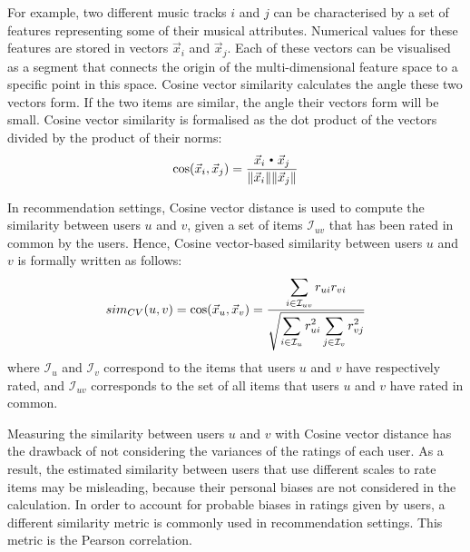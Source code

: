 For example, two different music tracks $i$ and $j$ can be characterised by a set of features representing some of their musical attributes. Numerical values for these features are stored in vectors $\vec{x}_i$ and $\vec{x}_j$. Each of these vectors can be visualised as a segment that connects the origin of the multi-dimensional feature space to a specific point in this space.
Cosine vector similarity calculates the angle these two vectors form. If the two items are similar, the angle their vectors form will be small. Cosine vector similarity is formalised as the dot product of the vectors divided by the product of their norms:
\begin{equation} 
\label{eq:cosine_vector_item_similarity}
\text{cos}(\vec{x}_i, \vec{x}_j) = 
\frac
{
    \vec{x}_i \Bigcdot \vec{x}_j 
}
{
	\|\vec{x}_i\| \|\vec{x}_j\|
} 
\end{equation}


In recommendation settings, Cosine vector distance is used to compute the similarity between users $u$ and $v$, given a set of items $\mathcal{I}_{uv}$ that has been rated in common by the users. 
Hence, Cosine vector-based similarity between users $u$ and $v$ is formally written as follows:
\begin{equation}
\label{eq:cosine_vector_user_similarity}
sim_{CV}({u,v}) = 
\text{cos}(\vec{x}_u, \vec{x}_v) = 
\frac{
\displaystyle\sum_{i \in \mathcal{I}_{uv}}r_{ui} r_{vi}} 
{ 
\sqrt
{
\displaystyle\sum_{i \in \mathcal{I}_u}r^2_{ui} 
\displaystyle\sum_{j \in \mathcal{I}_v}r^2_{vj}}
} 
\vspace{1em}
\end{equation}
where $\mathcal{I}_{u}$ and $\mathcal{I}_{v}$ correspond to the items that users $u$ and $v$ have respectively rated, and $\mathcal{I}_{uv}$ corresponds to the set of all items that users $u$ and $v$ have rated in common.

Measuring the similarity between users $u$ and $v$ with Cosine vector distance has the drawback of not considering the variances of the ratings of each user. 
As a result, the estimated similarity between users that use different scales to rate items may be misleading, because their personal biases are not considered in the calculation.
In order to account for probable biases in ratings given by users, a different similarity metric is commonly used in recommendation settings. This metric is the Pearson correlation.

